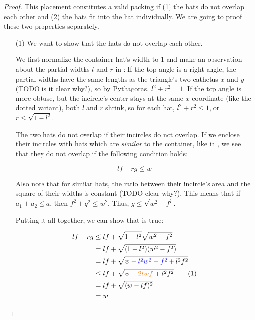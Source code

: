 \documentclass[a4paper,style=print,bibliography=totoc,nexus,lnum,extramargin]{tubsbook}
\begin{document}
\begin{proof}
    This placement constitutes a valid packing if (1) the hats do not overlap each other and (2) the hats fit into the hat individually. We are going to proof these two properties separately.

    \begin{itemize}
        \item[(1)]
            We want to show that the hats do not overlap each other.

            We first normalize the container hat's width to 1 and make an observation about the partial widths $l$ and $r$ in : If the top angle is a right angle, the partial widths have the same lengths as the triangle's two cathetus $x$ and $y$ (TODO is it clear why?), so by Pythagoras, $l^2 + r^2 = 1$. If the top angle is more obtuse, but the incircle's center stays at the same $x$-coordinate (like the dotted variant), both $l$ and $r$ shrink, so for each hat, $l^2 + r^2 \le 1$, or $r \le \sqrt{1-l^2}$.


            The two hats do not overlap if their incircles do not overlap. If we enclose their incircles with hats which are \emph{similar} to the container, like in , we see that they do not overlap if the following condition holds:

            \begin{equation}\label{eq:trifit}
                lf + rg \le w
            \end{equation}


            Also note that for similar hats, the ratio between their incircle's area and the square of their widths is constant (TODO clear why?). This means that if $a_1 + a_2 \le a$, then $f^2 + g^2 \le w^2$. Thus, $g \le \sqrt{w^2-f^2}$.

            Putting it all together, we can show that  is true:

            \begin{align*}
                lf + rg
                &\le lf + \sqrt{1-l^2} \sqrt{w^2-f^2}\\
                &= lf + \sqrt{(1-l^2)(w^2-f^2)}\\
                &= lf + \sqrt{w - \textcolor{blue}{l^2w^2} - \textcolor{blue}{f^2} + l^2f^2}\\
                &\le lf + \sqrt{w - \textcolor{orange}{2lwf} + l^2f^2}\addtocounter{equation}{1}\tag{\theequation}\label{eq:am-gm}\\
                &= lf + \sqrt{(w-lf)^2}\\
                &= w
            \end{align*}


\end{itemize}
\end{proof}
\end{document}
